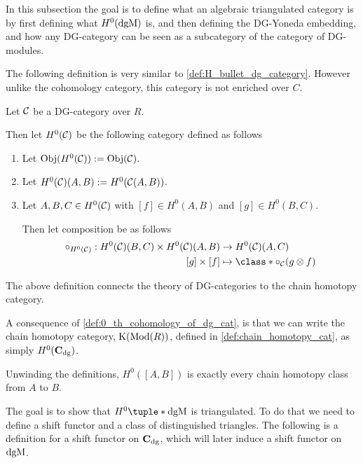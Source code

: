 In this subsection the goal is to define what an algebraic triangulated category is by first defining what \( H^0(\operatorname{dgM}) \) is, and then defining the DG-Yoneda embedding, and how any DG-category can be seen as a subcategory of the category of DG-modules.

The following definition is very similar to \autoref{def:H_bullet_dg_category}. However unlike the cohomology category, this category is not enriched over \( C \).

\begin{definition}
    \label{def:0_th_cohomology_of_dg_cat}
    Let \( {\mathcal{C}} \) be a DG-category over \( R \).

    Then let \( H^0({\mathcal{C}}) \) be the following category defined as follows
    \begin{enumerate}
        \item {
            Let \( \operatorname{Obj}(H^0({\mathcal{C}})) := \operatorname{Obj}({\mathcal{C}}) \).
        }
        \item {
            Let \( H^0({\mathcal{C}})(A, B) := H^0({\mathcal{C}}(A, B)) \).
        }
        \item {
            Let \( A, B, C \in H^0({\mathcal{C}}) \) with \( [f] \in H^0(A, B) \) and \( [g] \in H^0(B, C) \).

            Then let composition be as follows
            \begin{align*}
                \circ_{H^0(\Cc)}: H^0(\Cc)(B, C) \times H^0(\Cc)(A, B) &\to H^0(\Cc)(A, C) \\
                [g] \times [f] &\mapsto \class*{ \circ_{\Cc}(g \otimes f) }
            \end{align*}
        }
    \end{enumerate}
\end{definition}

The above definition connects the theory of DG-categories to the chain homotopy category.

\begin{remark}
    A consequence of \autoref{def:0_th_cohomology_of_dg_cat}, is that we can write the chain homotopy category, \( \operatorname{K}(\operatorname{Mod}(R)) \), defined in \autoref{def:chain_homotopy_cat}, as simply \( H^0(\operatorname{\mathbf{C}}_{\operatorname{dg}}) \).
    
    Unwinding the definitions, \( H^0([A, B]) \) is exactly every chain homotopy class from \( A \) to \( B \).
\end{remark}

The goal is to show that \( H^0\tuple*{\dgM} \) is triangulated. To do that we need to define a shift functor and a class of distinguished triangles. The following is a definition for a shift functor on \( \operatorname{\mathbf{C}}_{\operatorname{dg}} \), which will later induce a shift functor on \( \operatorname{dgM} \).

